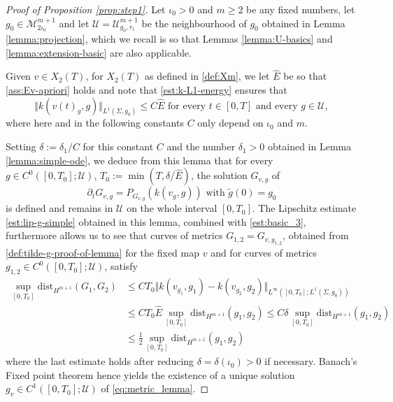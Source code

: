 \documentclass[10pt,reqno]{amsart}
\theoremstyle{plain}
\theoremstyle{definition}
\numberwithin{equation}{section}
\newcommand{\de}{\delta}
\newcommand{\Si}{\Sigma}
\newcommand{\norm}[1]{\Vert#1\Vert}
\newcommand{\beq}{\begin{equation}}
\newcommand{\eeq}{\end{equation}}
\newcommand{\beqas}{\begin{equation*}\begin{aligned}}
\newcommand{\eeqas}{\end{aligned}\end{equation*}}
\newcommand{\half}{\frac{1}{2}}
\newcommand{\pt}{\partial_t}
\newcommand{\dist}{\text{dist}}
\newcommand{\MM}{\mathcal{M}} %
\newcommand{\UU}{{\mathcal U}}
\newcommand{\Eupp}{\hat E}
\newcommand{\MMtwoiota}{\MM_{2\iota_0}}
\begin{document}
\begin{proof}[Proof of Proposition \ref{prop:step1}]
    Let $\iota_0>0$ and $m\geq 2$  be any fixed numbers, let $g_0\in \MMtwoiota^{m+1}$ and let $\UU=\UU_{g_0,r_1}^{m+1}$ be the neighbourhood of $g_0$ obtained in Lemma \ref{lemma:projection}, which we recall is so that Lemmas \ref{lemma:U-basics} and \ref{lemma:extension-basic} are also applicable. 
    
    Given $v\in X_2(T)$, for $X_2(T)$ as defined in \eqref{def:Xm}, we let $\Eupp$ be so that \eqref{ass:Ev-apriori} holds and note that  \eqref{est:k-L1-energy} ensures that 
    $$\norm{k(v(t)_g,g)}_{L^1(\Si,g_0)}\leq C \Eupp\text{ for every } t\in [0,T] \text{ and every }g\in \UU,$$
    where here and in the following constants $C$ only depend on $\iota_0$ and $m$.

    Setting $\de:=\de_1/C$ for this constant $C$ and the number $\de_1>0$ obtained in Lemma \ref{lemma:simple-ode}, we deduce from this lemma that for every  $g\in C^0([0,T_0];\UU)$, $T_0:=\min(T,\de/\Eupp)$, the solution $G_{v,g}$ of 
    \beq\label{def:tilde-g-proof-of-lemma} 
        \pt G_{v,g}=P_{G_{v,g}}(k(v_g,g)) \text{ with } \tilde g(0)=g_0
    \eeq
    is defined and remains in $\UU$ on the whole interval $[0,T_0]$. The Lipschitz estimate \eqref{est:lip-g-simple} obtained in this lemma, combined with \eqref{est:basic_3}, furthermore allows us to see that curves of metrics $G_{1,2}=G_{v,g_{1,2}}$, obtained from \eqref{def:tilde-g-proof-of-lemma} for the fixed map $v$ and for curves of metrics $g_{1,2}\in C^0([0,T_0];\UU)$, satisfy 
    \beqas
        \sup_{[0,T_0]} \dist_{H^{m+1}}(G_1,G_2)&\leq CT_0  \norm{k(v_{g_1},g_1)-k(v_{g_2},g_2)}_{L^\infty([0,T_0];L^1(\Si,g_0))}\\
        &\leq  CT_0 \Eupp\sup_{[0,T_0]} \dist_{H^{m+1}}(g_1,g_2)\leq C\de \sup_{[0,T_0]} \dist_{H^{m+1}}(g_1, g_2)\\
        &\leq \half \sup_{[0,T_0]} \dist_{H^{m+1}}(g_1,g_2)
    \eeqas
    where the last estimate holds after reducing $\de=\de(\iota_0)>0$ if necessary. Banach's Fixed point theorem hence yields the existence of a unique solution $g_v\in C^1([0,T_0];\UU)$ of \eqref{eq:metric_lemma}. 
    

\end{proof}
\end{document}
